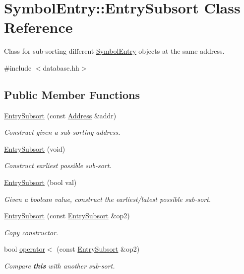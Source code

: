 \hypertarget{class_symbol_entry_1_1_entry_subsort}{}\section{Symbol\+Entry\+::Entry\+Subsort Class Reference}
\label{class_symbol_entry_1_1_entry_subsort}


Class for sub-\/sorting different \mbox{\hyperlink{class_symbol_entry}{Symbol\+Entry}} objects at the same address.  




{\ttfamily \#include $<$database.\+hh$>$}

\subsection*{Public Member Functions}
\begin{DoxyCompactItemize}
\item 
\mbox{\hyperlink{class_symbol_entry_1_1_entry_subsort_a37ee318e75dbbe9abaed154e1641b382}{Entry\+Subsort}} (const \mbox{\hyperlink{class_address}{Address}} \&addr)
\begin{DoxyCompactList}\small\item\em Construct given a sub-\/sorting address. \end{DoxyCompactList}\item 
\mbox{\hyperlink{class_symbol_entry_1_1_entry_subsort_ad16bd44c1e8a4278f2d8def2b7096b1d}{Entry\+Subsort}} (void)
\begin{DoxyCompactList}\small\item\em Construct earliest possible sub-\/sort. \end{DoxyCompactList}\item 
\mbox{\hyperlink{class_symbol_entry_1_1_entry_subsort_aaf47207b765a3369dd0b86db939d6c75}{Entry\+Subsort}} (bool val)
\begin{DoxyCompactList}\small\item\em Given a boolean value, construct the earliest/latest possible sub-\/sort. \end{DoxyCompactList}\item 
\mbox{\hyperlink{class_symbol_entry_1_1_entry_subsort_a887b5a3c21dadb45e2e85f83cd827e28}{Entry\+Subsort}} (const \mbox{\hyperlink{class_symbol_entry_1_1_entry_subsort}{Entry\+Subsort}} \&op2)
\begin{DoxyCompactList}\small\item\em Copy constructor. \end{DoxyCompactList}\item 
bool \mbox{\hyperlink{class_symbol_entry_1_1_entry_subsort_ab741d5e84221244d593cd57e651ca0a7}{operator$<$}} (const \mbox{\hyperlink{class_symbol_entry_1_1_entry_subsort}{Entry\+Subsort}} \&op2)
\begin{DoxyCompactList}\small\item\em Compare {\bfseries{this}} with another sub-\/sort. \end{DoxyCompactList}\end{DoxyCompactItemize}
